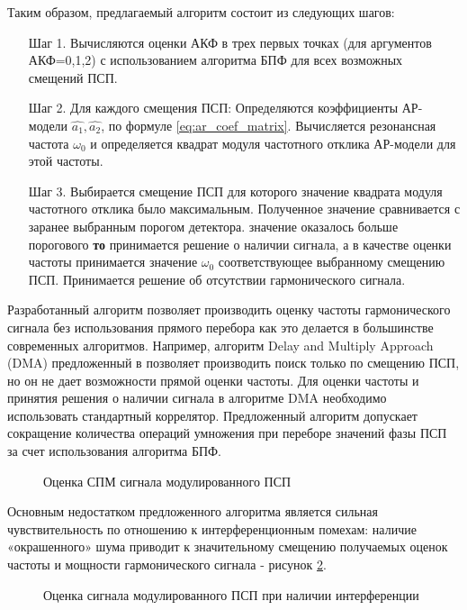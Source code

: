 Таким образом, предлагаемый алгоритм состоит из следующих шагов:

\begin{itemize}
\item[Шаг 1.] Вычисляются оценки  АКФ в трех первых точках (для аргументов АКФ=0,1,2)
	с использованием алгоритма БПФ для всех возможных смещений ПСП. 
\item[Шаг 2.] Для каждого смещения ПСП: 
	Определяются коэффициенты АР-модели ${\hat{a_1}, \hat{a_2}}$, 
	по формуле \ref{eq:ar_coef_matrix}.
	Вычисляется резонансная частота ${\omega_0}$
	и определяется квадрат модуля частотного отклика АР-модели для этой частоты. 
\item[Шаг 3.] Выбирается смещение ПСП для которого значение квадрата модуля частотного отклика было максимальным. Полученное значение сравнивается с заранее выбранным порогом детектора. 
	  значение оказалось больше порогового {\bf{то}} 
		принимается решение о наличии сигнала, а в качестве оценки
		частоты принимается значение ${\omega_0}$ соответствующее выбранному смещению ПСП. 
		Принимается решение об отсутствии гармонического сигнала.
\end{itemize}

Разработанный алгоритм позволяет производить оценку частоты гармонического сигнала без использования прямого перебора как это делается в большинстве современных алгоритмов.
Например, алгоритм Delay and Multiply Approach (DMA) предложенный в \cite{tsui,lin_dma} позволяет производить поиск только по смещению ПСП,
но он не дает возможности прямой оценки частоты. Для оценки частоты и принятия решения о наличии сигнала в алгоритме DMA необходимо использовать стандартный коррелятор.
Предложенный алгоритм допускает сокращение количества операций умножения при переборе значений фазы ПСП за счет использования алгоритма БПФ.

\begin{figure}[H]
	\center{}
	\caption{Оценка СПМ сигнала модулированного ПСП}
	\label{pic:ar_cdma1_freq_est1}
\end{figure}

Основным недостатком предложенного алгоритма является сильная чувствительность по отношению к интерференционным помехам: наличие «окрашенного» шума приводит к
значительному смещению получаемых оценок частоты и мощности гармонического сигнала - рисунок \ref{pic:ar_cdma1_freq_est2}.

\begin{figure}[H]
	\center{}
	\caption{Оценка сигнала модулированного ПСП при наличии интерференции}
	\label{pic:ar_cdma1_freq_est2}
\end{figure}
